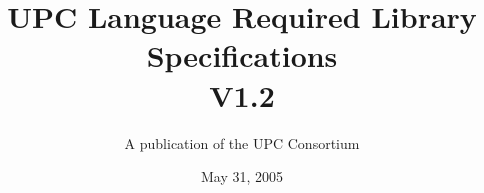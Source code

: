 

\makeindex

\title{UPC Language Required Library Specifications\\
V1.2 }

\author{A publication of the UPC Consortium}

\date {May 31, 2005}



\maketitle

\setcounter{page}{2}


\newpage
\setlength {\parskip}{0ex}
\tableofcontents                                             
\setlength {\parskip}{1.3ex}
\newpage








\pagebreak
\printindex

